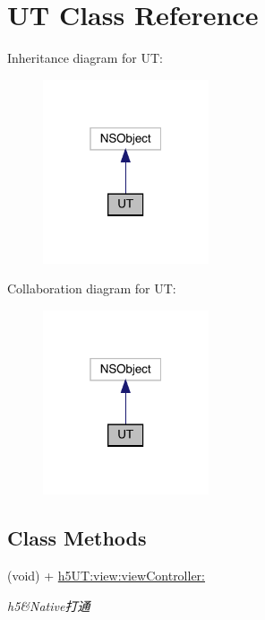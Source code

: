 \hypertarget{interface_u_t}{}\section{UT Class Reference}
\label{interface_u_t}


Inheritance diagram for UT\+:\nopagebreak
\begin{figure}[H]
\begin{center}
\leavevmode
\includegraphics[width=139pt]{interface_u_t__inherit__graph}
\end{center}
\end{figure}


Collaboration diagram for UT\+:\nopagebreak
\begin{figure}[H]
\begin{center}
\leavevmode
\includegraphics[width=139pt]{interface_u_t__coll__graph}
\end{center}
\end{figure}
\subsection*{Class Methods}
\begin{DoxyCompactItemize}
\item 
(void) + \mbox{\hyperlink{interface_u_t_aa3f1931237de122a88454feb4605c8ce}{h5\+U\+T\+:view\+:view\+Controller\+:}}
\begin{DoxyCompactList}\small\item\em h5\&Native打通 \end{DoxyCompactList}\end{DoxyCompactItemize}


